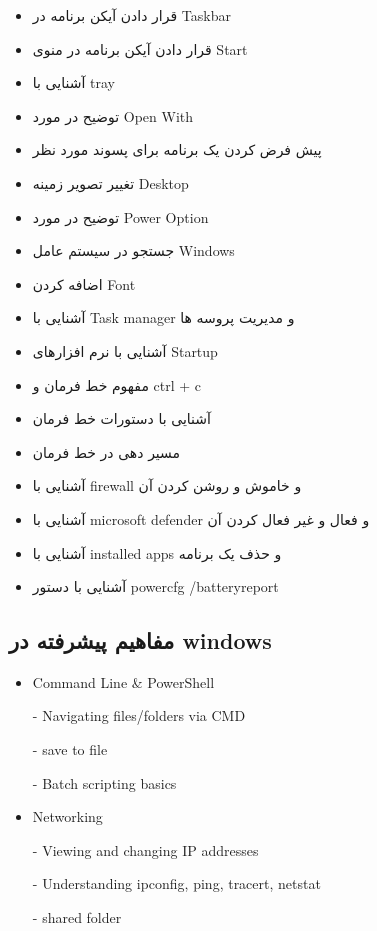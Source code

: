 \begin{itemize}
\item
قرار دادن آیکن برنامه در Taskbar
\item
قرار دادن آیکن برنامه در منوی Start
\item
آشنایی با tray
\item
توضیح در مورد Open With
\item
پیش فرض کردن یک برنامه برای پسوند مورد نظر
\item
تغییر تصویر زمینه Desktop
\item
توضیح در مورد Power Option
\item
جستجو در سیستم عامل Windows
\item
اضافه کردن Font
\item
آشنایی با Task manager و مدیریت پروسه ها
\item
آشنایی با نرم افزارهای Startup
\item
مفهوم خط فرمان و ctrl + c
\item
آشنایی با دستورات خط فرمان
\item
مسیر دهی در خط فرمان
\item
آشنایی با firewall و خاموش و روشن کردن آن
\item
آشنایی با microsoft defender و فعال و غیر فعال کردن آن
\item
آشنایی با installed apps و حذف یک برنامه
\item
آشنایی با دستور powercfg /batteryreport
\end{itemize}

\subsection{مفاهیم پیشرفته در windows}
\begin{itemize}
\item
Command Line \& PowerShell
\item [-]
Navigating files/folders via CMD
\item [-]
save to file
\item [-]
Batch scripting basics

\item
Networking
\item [-]
Viewing and changing IP addresses
\item [-]
Understanding ipconfig, ping, tracert, netstat
\item [-]
shared folder

\end{itemize}